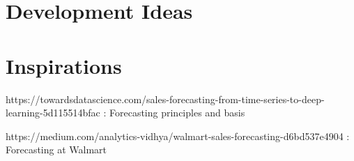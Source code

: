 \documentclass{report}
\begin{document}
\chapter{Development Ideas}



\chapter{Inspirations}

https://towardsdatascience.com/sales-forecasting-from-time-series-to-deep-learning-5d115514bfac : Forecasting principles and basis 

https://medium.com/analytics-vidhya/walmart-sales-forecasting-d6bd537e4904 : Forecasting at Walmart 
\end{document}
